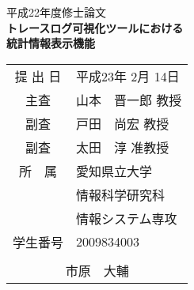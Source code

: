 ﻿\documentclass[12pt,report]{jsbook}
\begin{document}
\pagestyle{empty}

%
\thispagestyle{empty}
\vspace*{1cm}
{\normalsize 
\begin{center}
{\Large 平成22年度\hspace{1cm}修士論文}\\\vspace{1.5cm}
\huge{\bf トレースログ可視化ツールにおける\\統計情報表示機能}\\
\vspace{6.8cm}
\end{center}

\begin{flushright}
\begin{tabular}{cl}
\\提 出 日   & 平成23年 2月 14日\\\vspace{-1mm}
主査 & 山本　晋一郎 教授\\\vspace{-1mm}
副査 & 戸田　尚宏 教授\\\vspace{-1mm}
副査 & 太田　淳 准教授\\\vspace{-1mm}
所　属     & 愛知県立大学\\\vspace{-1mm}
           & 情報科学研究科\\\vspace{-1mm}
           & 情報システム専攻\\\vspace{-1mm}
学生番号   & 2009834003\\
           & \\
\multicolumn{2}{c}{\Large{市原　大輔}}
\end{tabular}
\end{flushright}
}
\newpage
\pagestyle{plain} 
\setcounter{page}{1}
\setcounter{tocdepth}{2}
\tableofcontents

\clearpage
\pagestyle{plain} 
\setcounter{page}{1}
\end{document}
